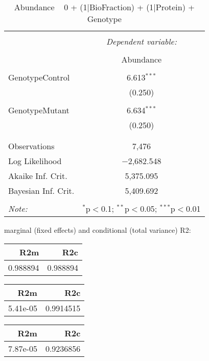 \documentclass[11pt]{report}
\begin{document}
\begin{table}[!htbp] \centering 
  \caption{Abundance ~ 0 + (1|BioFraction) + (1|Protein) + Genotype} 
  \label{} 
\begin{tabular}{@{\extracolsep{5pt}}lc} 
\\[-1.8ex]\hline 
\hline \\[-1.8ex] 
 & \multicolumn{1}{c}{\textit{Dependent variable:}} \\ 
\cline{2-2} 
\\[-1.8ex] & Abundance \\ 
\hline \\[-1.8ex] 
 GenotypeControl & 6.613$^{***}$ \\ 
  & (0.250) \\ 
  & \\ 
 GenotypeMutant & 6.634$^{***}$ \\ 
  & (0.250) \\ 
  & \\ 
\hline \\[-1.8ex] 
Observations & 7,476 \\ 
Log Likelihood & $-$2,682.548 \\ 
Akaike Inf. Crit. & 5,375.095 \\ 
Bayesian Inf. Crit. & 5,409.692 \\ 
\hline 
\hline \\[-1.8ex] 
\textit{Note:}  & \multicolumn{1}{r}{$^{*}$p$<$0.1; $^{**}$p$<$0.05; $^{***}$p$<$0.01} \\ 
\end{tabular} 
\end{table} 
marginal (fixed effects) and conditional (total variance) R2:

\begin{tabular}{r|r}
\hline
R2m & R2c\\
\hline
0.988894 & 0.988894\\
\hline
\end{tabular}

\begin{tabular}{r|r}
\hline
R2m & R2c\\
\hline
5.41e-05 & 0.9914515\\
\hline
\end{tabular}

\begin{tabular}{r|r}
\hline
R2m & R2c\\
\hline
7.87e-05 & 0.9236856\\
\hline
\end{tabular}
\end{document}
